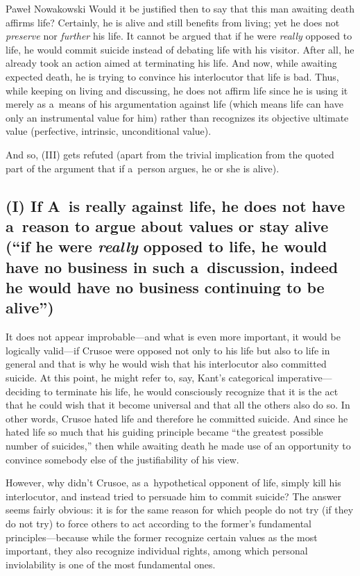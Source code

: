\begin{artengenv}{Paweł Nowakowski}
Would it be justified then to say that this man awaiting death affirms life? Certainly, he is alive and still benefits from living; yet he does not \textit{preserve} nor \textit{further} his life. It cannot be argued that if he were \textit{really} opposed to life, he would commit suicide instead of debating life with his visitor. After all, he already took an action aimed at terminating his life. And now, while awaiting expected death, he is trying to convince his interlocutor that life is bad. Thus, while keeping on living and discussing, he does not affirm life since he is using it merely as a~means of his argumentation against life (which means life can have only an instrumental value for him) rather than recognizes its objective ultimate value (perfective, intrinsic, unconditional value).



And so, (III) gets refuted (apart from the trivial implication from the quoted part of the argument that if a~person argues, he or she is alive).



\subsection{\textbf{(I) If A~is really against life, he does not have a~reason to argue about values or stay alive }
(``if he were \textit{really} opposed to life, he would have no business in such a~discussion, indeed he would have no business continuing to be alive'')}



It does not appear improbable---and what is even more important, it would be logically valid---if Crusoe were opposed not only to his life but also to life in general and that is why he would wish that his interlocutor also committed suicide. At this point, he might refer to, say, Kant's categorical imperative---deciding to terminate his life, he would consciously recognize that it is the act that he could wish that it become universal and that all the others also do so. In other words, Crusoe hated life and therefore he committed suicide. And since he hated life so much that his guiding principle became ``the greatest possible number of suicides,'' then while awaiting death he made use of an opportunity to convince somebody else of the justifiability of his view.



However, why didn't Crusoe, as a~hypothetical opponent of life, simply kill his interlocutor, and instead tried to persuade him to commit suicide? The answer seems fairly obvious: it is for the same reason for which people do not try (if they do not try) to force others to act according to the former's fundamental principles---because while the former recognize certain values as the most important, they also recognize individual rights, among which personal inviolability is one of the most fundamental ones.




\end{artengenv}
